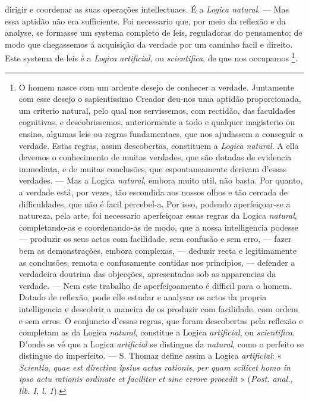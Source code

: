 dirigir e coordenar as suas operações intellectuaes. É a \emph{Logica natural}. --- Mas essa aptidão não era sufficiente. Foi necessario que, por meio da reflexão e da analyse, se formasse um systema completo de leis, reguladoras do pensamento; de modo que chegassemos á acquisição da verdade por um caminho facil e direito. Este systema de leis é a \emph{Logica artificial}, ou \emph{scientifica}, de que nos occupamos \footnote{O homem nasce com um ardente desejo de conhecer a verdade. Juntamente com esse desejo o sapientissimo Creador deu-nos uma aptidão proporcionada, um criterio natural, pelo qual nos servissemos, com rectidão, das faculdades cognitivas, e descobrissemos, anteriormente a todo e qualquer magisterio ou ensino, algumas leis ou regras fundamentaes, que nos ajudassem a conseguir a verdade. Estas regras, assim descobertas, constituem a \emph{Logica natural}. A ella devemos o conhecimento de muitas verdades, que são dotadas de evidencia immediata, e de muitas conclusões, que espontaneamente derivam d'essas verdades. --- Mas a Logica \emph{natural}, embora muito util, não basta. Por quanto, a verdade está, por vezes, tão escondida aos nossos olhos e tão cercada de difficuldades, que não é facil percebel-a. Por isso, podendo aperfeiçoar-se a natureza, pela arte, foi necessario aperfeiçoar essas regras da Logica \emph{natural}, completando-as e coordenando-as de modo, que a nossa intelligencia podesse --- produzir os seus actos com facilidade, sem confusão e sem erro, --- fazer bem as demonstrações, embora complexas, --- deduzir recta e legitimamente as conclusões, remota e confusamente contidas nos principios, --- defender a verdadeira doutrina das objecções, apresentadas sob as apparencias da verdade. --- Nem este trabalho de aperfeiçoamento é difficil para o homem. Dotado de reflexão, pode elle estudar e analysar os actos da propria intelligencia e descobrir a maneira de os produzir com facilidade, com ordem e sem erros. O conjuncto d'essas regras, que foram descobertas pela reflexão e completam as da Logica \emph{natural}, constitue a Logica \emph{artificial}, ou \emph{scientifica}. D'onde se vê que a Logica \emph{artificial} se distingue da \emph{natural}, como o perfeito se distingue do imperfeito. --- S. Thomaz define assim a Logica \emph{artificial}: « \emph{Scientia}, \emph{quae est directiva ipsius actus rationis}, \emph{per quam scilicet homo in ipso actu rationis ordinate et faciliter et sine errore procedit} » (\emph{Post. anal., lib. I, l. 1}).}.

